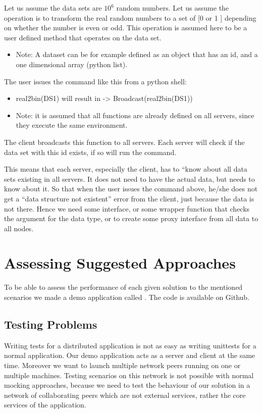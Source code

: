 Let us assume the data sets are \(10^6\) random numbers.
Let us assume the operation is to transform the real random numbers to a set of [0 or 1 ] depending on whether the number is even or odd. 
This operation is assumed here to be a user defined method that operates on the data set.

\begin{itemize}
\item Note: A dataset can be for example defined as an object that has an id, and a one dimensional array (python list).
\end{itemize}

The user issues the command like this from a python shell: 

\begin{itemize}
\item real2bin(DS1) will result in -> Broadcast(real2bin(DS1))
\item Note: it is assumed that all functions are already defined on all servers, since they execute the same environment.
\end{itemize}

The client broadcasts this function to all servers. Each server will check if the data set with this id exists, if so will run the command. 

This means that each server, especially the client, has to “know about all data sets existing in all servers.
It does not need to have the actual data, but needs to know about it. So that when the user issues the command
above, he/she does not get a “data structure not existent” error from the client, just because the data is not
there. Hence we need some interface, or some wrapper function that checks the argument for the data type, or to 
create some proxy interface from all data to all nodes. 

\section{Assessing Suggested Approaches}
To be able to assess the performance of each given solution to the mentioned scenarios we made a demo application
called . The code is available on Github. %

\subsection{Testing Problems}
Writing tests for a distributed application is not as easy as writing unittests for a normal application. 
Our demo application acts as a server and client at the same time. Moreover we want to launch multiple 
network peers running on one or multiple machines. Testing scenarios on this network is not possible with
normal mocking approaches, because we need to test the behaviour of our solution in a network of collaborating
peers which are not external services, rather the core services of the application.

